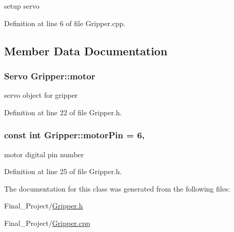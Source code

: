setup servo 



Definition at line 6 of file Gripper.\-cpp.



\subsection{Member Data Documentation}
\hypertarget{classGripper_ad72d0ae4ccd2be00ec3f303e7a0c1cc9}{
\subsubsection[{motor}]{\setlength{\rightskip}{0pt plus 5cm}Servo Gripper\-::motor\hspace{0.3cm}{\ttfamily [private]}}}\label{classGripper_ad72d0ae4ccd2be00ec3f303e7a0c1cc9}


servo object for gripper 



Definition at line 22 of file Gripper.\-h.

\hypertarget{classGripper_ae12467d04d155401f1c6ba694b295f40}{
\subsubsection[{motor\-Pin}]{\setlength{\rightskip}{0pt plus 5cm}const int Gripper\-::motor\-Pin = 6\hspace{0.3cm}{\ttfamily [static]}, {\ttfamily [private]}}}\label{classGripper_ae12467d04d155401f1c6ba694b295f40}


motor digital pin number 



Definition at line 25 of file Gripper.\-h.



The documentation for this class was generated from the following files\-:\begin{DoxyCompactItemize}
\item 
Final\-\_\-\-Project/\hyperlink{Gripper_8h}{Gripper.\-h}\item 
Final\-\_\-\-Project/\hyperlink{Gripper_8cpp}{Gripper.\-cpp}\end{DoxyCompactItemize}
